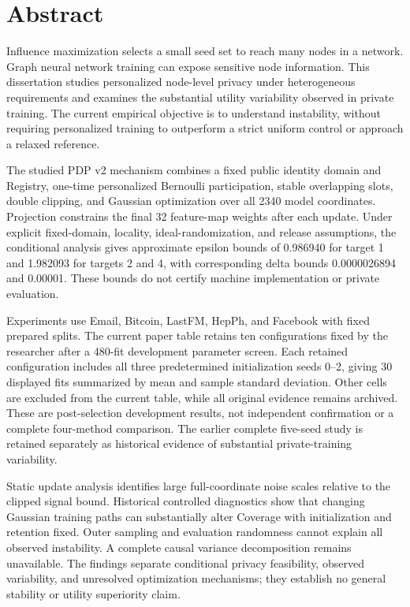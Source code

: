 \chapter*{Abstract}
Influence maximization selects a small seed set to reach many nodes in a network. Graph neural network training can expose sensitive node information. This dissertation studies personalized node-level privacy under heterogeneous requirements and examines the substantial utility variability observed in private training. The current empirical objective is to understand instability, without requiring personalized training to outperform a strict uniform control or approach a relaxed reference.

The studied PDP v2 mechanism combines a fixed public identity domain and Registry, one-time personalized Bernoulli participation, stable overlapping slots, double clipping, and Gaussian optimization over all 2340 model coordinates. Projection constrains the final 32 feature-map weights after each update. Under explicit fixed-domain, locality, ideal-randomization, and release assumptions, the conditional analysis gives approximate epsilon bounds of 0.986940 for target 1 and 1.982093 for targets 2 and 4, with corresponding delta bounds 0.0000026894 and 0.00001. These bounds do not certify machine implementation or private evaluation.

Experiments use Email, Bitcoin, LastFM, HepPh, and Facebook with fixed prepared splits. The current paper table retains ten configurations fixed by the researcher after a 480-fit development parameter screen. Each retained configuration includes all three predetermined initialization seeds 0--2, giving 30 displayed fits summarized by mean and sample standard deviation. Other cells are excluded from the current table, while all original evidence remains archived. These are post-selection development results, not independent confirmation or a complete four-method comparison. The earlier complete five-seed study is retained separately as historical evidence of substantial private-training variability.

Static update analysis identifies large full-coordinate noise scales relative to the clipped signal bound. Historical controlled diagnostics show that changing Gaussian training paths can substantially alter Coverage with initialization and retention fixed. Outer sampling and evaluation randomness cannot explain all observed instability. A complete causal variance decomposition remains unavailable. The findings separate conditional privacy feasibility, observed variability, and unresolved optimization mechanisms; they establish no general stability or utility superiority claim.
\clearpage
